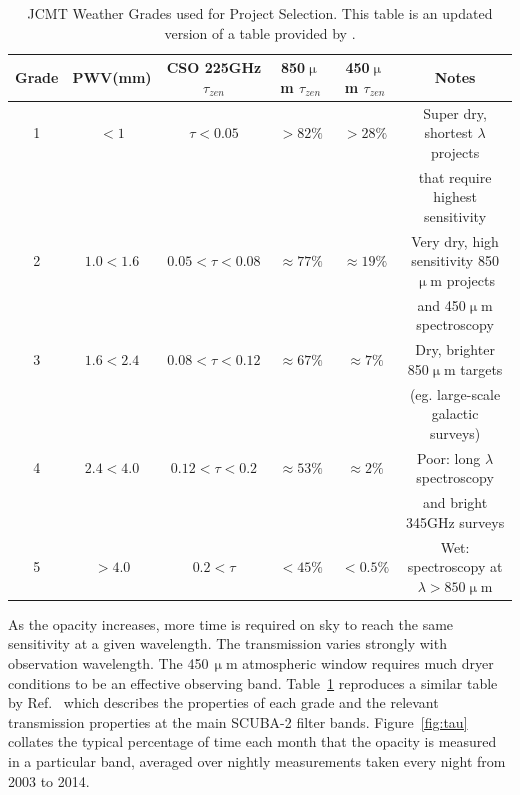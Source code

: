 \documentclass[]{spie}  %
\begin{document}
\begin{table}
\caption{JCMT Weather Grades used for Project Selection. This table is an updated version of a table provided by \cite{robson2002}.}
\label{tab:grades}
\begin{center}
\begin{tabular}{|c|c|c|c|c|c|}
\hline
\rule[-1ex]{0pt}{3.5ex}  Grade & PWV(mm) & CSO 225GHz $\tau_{zen}$ & 850$\upmu$m $\tau_{zen}$ & 450$\upmu$m $\tau_{zen}$ & Notes  \\
\hline
\rule[-1ex]{0pt}{3.5ex}  1 & $< 1$ & $\tau<0.05$ & $> 82\%$ &   $ > 28\%$& Super dry, shortest $\lambda$ projects\\&&&&& that require highest sensitivity\\
\hline
\rule[-1ex]{0pt}{3.5ex}  2 & $1.0 < 1.6$ & $0.05<\tau<0.08$ &  $ \approx77\%$ & $\approx19\%$ &Very dry, high sensitivity 850$\upmu$m projects\\&&&&& and 450$\upmu$m spectroscopy\\
\hline
\rule[-1ex]{0pt}{3.5ex}  3 & $1.6 < 2.4$  & $0.08<\tau<0.12$ &  $\approx67\%$ & $\approx7\%$ & Dry, brighter 850$\upmu$m targets\\ &&&&&(eg. large-scale galactic surveys)\\
\hline
\rule[-1ex]{0pt}{3.5ex}  4 & $2.4 < 4.0$ & $0.12<\tau<0.2$ &  $\approx53\%$ & $\approx2\%$ & Poor: long $\lambda$ spectroscopy \\&&&&&and bright 345GHz surveys\\
\hline
\rule[-1ex]{0pt}{3.5ex}  5 & $ > 4.0 $ & $0.2<\tau$ & $ < 45\%$ & $< 0.5\%$&  Wet: spectroscopy at $\lambda > 850 \upmu$m \\
\hline

\end{tabular}
\end{center}
\end{table}

As the opacity increases, more time is required on sky to reach the
same sensitivity at a given wavelength. The transmission varies
strongly with observation wavelength. The 450\,$\upmu$m atmospheric window
requires much dryer conditions to be an effective observing
band. Table~\ref{tab:grades} reproduces a similar table by
Ref.\  which describes the properties of each grade and the
relevant transmission properties at the main SCUBA-2 filter
bands. Figure~\ref{fig:tau} collates the typical percentage of time
each month that the opacity is measured in a particular band, averaged
over nightly measurements taken every night from 2003 to 2014.
\end{document}
